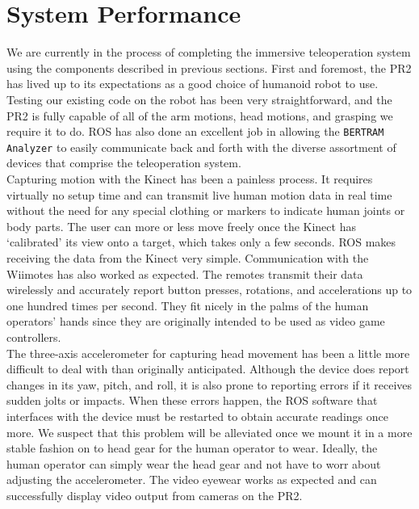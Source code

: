 \documentclass{sig-alternate}
\begin{document}
\section{System Performance}
\indent We are currently in the process of completing the immersive teleoperation system using the components described in previous sections. First and foremost, the PR2 has lived up to its expectations as a good choice of humanoid robot to use. Testing our existing code on the robot has been very straightforward, and the PR2 is fully capable of all of the arm motions, head motions, and grasping we require it to do. ROS has also done an excellent job in allowing the {\tt BERTRAM Analyzer} to easily communicate back and forth with the diverse assortment of devices that comprise the teleoperation system.\\
\indent Capturing motion with the Kinect has been a painless process. It requires virtually no setup time and can transmit live human motion data in real time without the need for any special clothing or markers to indicate human joints or body parts. The user can more or less move freely once the Kinect has `calibrated' its view onto a target, which takes only a few seconds. ROS makes receiving the data from the Kinect very simple. Communication with the Wiimotes has also worked as expected. The remotes transmit their data wirelessly and accurately report button presses, rotations, and accelerations up to one hundred times per second. They fit nicely in the palms of the human operators' hands since they are originally intended to be used as video game controllers.\\
\indent The three-axis accelerometer for capturing head movement has been a little more difficult to deal with than originally anticipated. Although the device does report changes in its yaw, pitch, and roll, it is also prone to reporting errors if it receives sudden jolts or impacts. When these errors happen, the ROS software that interfaces with the device must be restarted to obtain accurate readings once more. We suspect that this problem will be alleviated once we mount it in a more stable fashion on to head gear for the human operator to wear. Ideally, the human operator can simply wear the head gear and not have to worr about adjusting the accelerometer. The video eyewear works as expected and can successfully display video output from cameras on the PR2.
\end{document}
